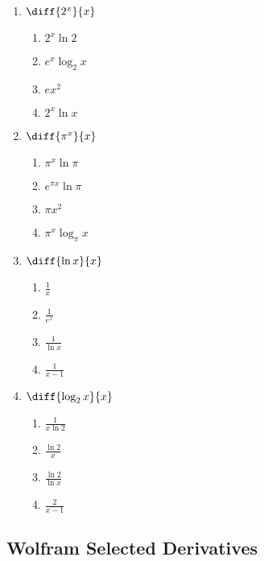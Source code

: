 \documentclass[10pt,twocolumn]{article}
\begin{document}
\begin{enumerate}
		\item \(\diff{2^x}{x}\)
	\begin{enumerate}
		\item \(2^x \ln{2}\)
		\item \(e^x \log_2{x}\)
		\item \(ex^2\)
		\item \(2^x\ln{x}\)
	\end{enumerate}


		\item \(\diff{\pi^x}{x}\)
	\begin{enumerate}
		\item \(\pi^x \ln{\pi}\)
		\item \(e^{\pi x} \ln{\pi}\)
		\item \(\pi x^2\)
		\item \(\pi^x \log_{\pi}{x}\)
	\end{enumerate}


		\item \(\diff{\ln{x}}{x}\)
	\begin{enumerate}
		\item \(\frac{1}{x}\)
		\item \(\frac{1}{e^x}\)
		\item \(\frac{1}{\ln{x}}\)
		\item \(\frac{1}{x-1}\)
	\end{enumerate}


		\item \(\diff{\log_2{x}}{x}\)
	\begin{enumerate}
		\item \(\frac{1}{x \ln{2}}\)
		\item \(\frac{\ln{2}}{x}\)
		\item \(\frac{\ln{2}}{\ln{x}}\)
		\item \(\frac{2}{x-1}\)
	\end{enumerate}

\end{enumerate}

\subsection{Wolfram Selected Derivatives}
\end{document}
